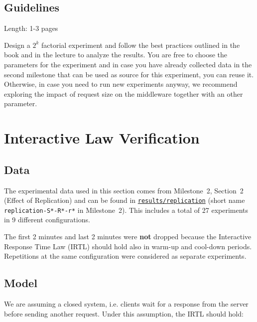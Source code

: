 \documentclass[11pt]{article}
\begin{document}
\subsection{Guidelines}
Length: 1-3 pages

Design a $2^k$ factorial experiment and follow the best practices outlined in the book and in the lecture to analyze the results. You are free to choose the parameters for the experiment and in case you have already collected data in the second milestone that can be used as source for this experiment, you can reuse it. Otherwise, in case you need to run new experiments anyway, we recommend exploring the impact of request size on the middleware together with an other parameter.

\clearpage
\section{Interactive Law Verification}\label{sec:part5-interactive-law}

\subsection{Data}

The experimental data used in this section comes from Milestone~2, Section~2 (Effect of Replication) and can be found in \texttt{\href{https://gitlab.inf.ethz.ch/pungast/asl-fall16-project/tree/master/results/replication}{results/replication}} (short name \texttt{replication-S*-R*-r*} in Milestone~2). This includes a total of 27 experiments in 9 different configurations.

The first 2 minutes and last 2 minutes were \textbf{not} dropped because the Interactive Response Time Law (IRTL) should hold also in warm-up and cool-down periods. Repetitions at the same configuration were considered as separate experiments.

\subsection{Model}

We are assuming a closed system, i.e. clients wait for a response from the server before sending another request. Under this assumption, the IRTL should hold:
\end{document}
